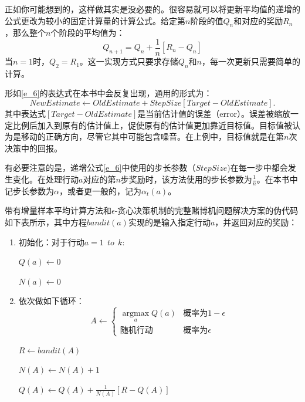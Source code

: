 \documentclass{ctexart}
\begin{document}
            正如你可能想到的，这样做其实是没必要的。很容易就可以将更新平均值的递增的公式更改为较小的固定计算量的计算公式。给定第$n$阶段的值$Q_n$和对应的奖励$R_n$，那么整个$n$个阶段的平均值为：
            \begin{equation}
                Q_{n+1} = Q_n + \frac{1}{n} [R_n - Q_n]
                \label{e_6}
            \end{equation}
            当$n=1$时，$Q_2=R_1$。这一实现方式只要求存储$Q_n$和$n$，每一次更新只需要简单的计算。

            形如\ref{e_6}的表达式在本书中会反复出现，通用的形式为：
            \begin{equation}
                NewEstimate \leftarrow OldEstimate + StepSize [Target - OldEstimate] .
                \label{e_7}
            \end{equation}
            其中表达式$[Target-OldEstimate]$是当前估计值的误差（error）。误差被缩放一定比例后加入到原有的估计值上，促使原有的估计值更加靠近目标值。目标值被认为是移动的正确方向，尽管它其中可能包含噪音。在上例中，目标值就是在第$n$次决策中的回报。

            有必要注意的是，递增公式\ref{e_6}中使用的步长参数（$StepSize$)在每一步中都会发生变化。在处理行动$a$对应的第$n$步奖励时，该方法使用的步长参数为$\frac{1}{n}$。在本书中记步长参数为$\alpha$，或者更一般的，记为$\alpha_t(a)$。

            带有增量样本平均计算方法和$\epsilon$-贪心决策机制的完整赌博机问题解决方案的伪代码如下表所示，其中方程$bandit(a)$实现的是输入指定行动$a$，并返回对应的奖励：
            \begin{enumerate}
                \item 初始化：对于行动$a=1\ \ to\ \ k$:

                     $Q(a)\leftarrow 0$

                     $N(a) \leftarrow 0$
                \item 依次做如下循环：
                    \begin{equation}
                        A \leftarrow \left\{
                            \begin{matrix}
                                \operatorname*{argmax}\limits_{a} Q(a) & \text{概率为} 1-\epsilon \\
                                \text{随机行动} & \text{概率为}\epsilon
                            \end{matrix}
                            \right.
                    \end{equation}

                    $R \leftarrow bandit(A)$

                    $N(A) \leftarrow N(A) + 1$

                    $Q(A) \leftarrow Q(A) + \frac{1}{N(A)}[R - Q(A)]$
            \end{enumerate}
\end{document}
